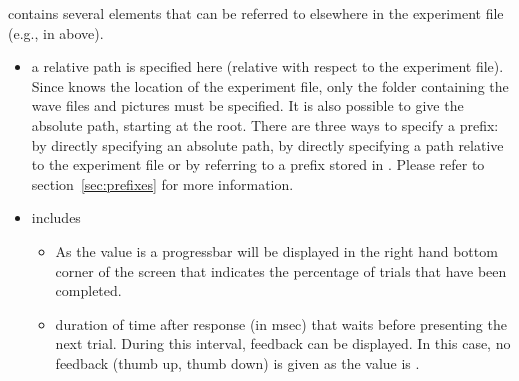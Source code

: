  contains several  elements that
can be referred to elsewhere in the experiment file (e.g., in
 above).

\begin{itemize}
\item {} a relative path is specified here
(relative with respect to the experiment file). Since \apex knows
the location of the experiment file, only the folder containing
the wave files and pictures must be specified. It is also possible
to give the absolute path, starting at the root. There are three ways
to specify a prefix: by directly specifying an absolute path, by
directly specifying a path relative to the experiment file or by
referring to a prefix stored in . Please
refer to section~\ref{sec:prefixes} for more information.

\item {} includes

\begin{itemize}

\item {} As the value is  a
progressbar will be displayed in the right hand bottom corner of
the screen that indicates the percentage of trials that have been completed.

\item {} duration of time after response
(in msec) that \apex waits before presenting the next trial.
During this interval, feedback can be displayed. In this case, no
feedback (thumb up, thumb down) is given as the value is
.

\end{itemize}
\end{itemize}

